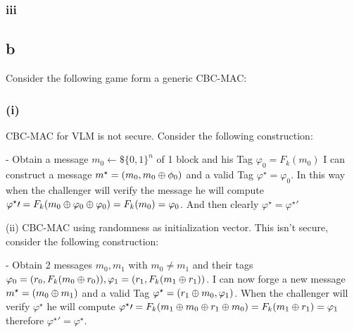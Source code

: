 \documentclass[11pt]{article}
\newcounter{t0d0_counter}
\begin{document}
\subsubsection{ iii }


\subsection{b}

Consider the following game form a generic CBC-MAC:

\begin{figure}[h!]
   \centering
   \sdinit{}
\end{figure}

\subsubsection{(i)}
CBC-MAC for VLM is not secure. Consider the following construction:

- Obtain a message $m_0\leftarrow\$\{0,1\}^n$ of 1 block and his Tag $\varphi_0 =F_k(m_0)$
I can construct a message $m^\star=(m_0,m_0\oplus \phi_0)$ and a valid Tag $\varphi^\star=\varphi_0$.
In this way when the challenger will verify the message he will compute $\varphi^\star\prime=F_k(m_0\oplus\varphi_0\oplus\varphi_0)=F_k(m_0)=\varphi_0$. 
And then clearly $\varphi^\star=\varphi^\star\prime$

(ii)
CBC-MAC using randomness as initialization vector. This isn't secure, consider the following construction:

- Obtain 2 messages $m_0, m_1$ with $m_0\neq m_1$ and their tags $\varphi_0=(r_0,F_k(m_0\oplus r_0)), \varphi_1=(r_1,F_k(m_1\oplus r_1))$.
I can now forge a new message $m^\star=(m_0\oplus m_1)$ and a valid Tag $\varphi^\star=(r_1\oplus m_0, \varphi_1)$.
When the challenger will verify $\varphi^\star$ he will compute
$\varphi^\star\prime=F_k(m_1\oplus m_0\oplus r_1\oplus m_0)=F_k(m_1\oplus r_1)=\varphi_1$
therefore $\varphi^\star\prime=\varphi^\star$.
\end{document}
